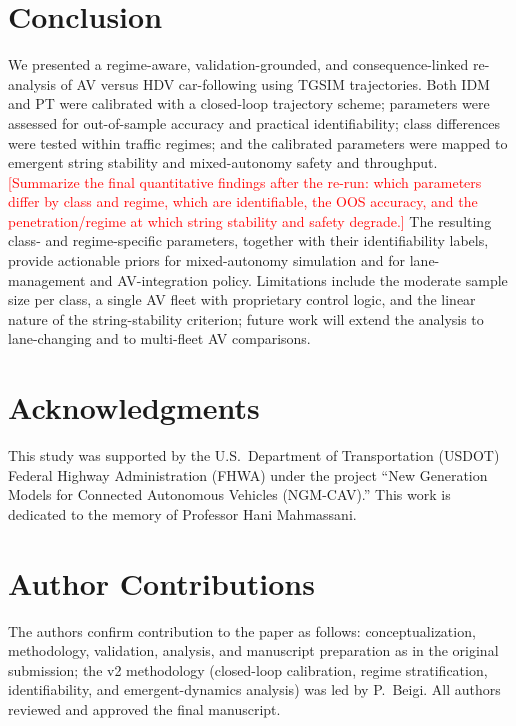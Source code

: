 \documentclass[11pt]{article}
\newcommand{\tbd}[1]{\textcolor{red}{[#1]}}        %
\begin{document}
\section{Conclusion}
We presented a regime-aware, validation-grounded, and consequence-linked
re-analysis of AV versus HDV car-following using TGSIM trajectories. Both IDM and
PT were calibrated with a closed-loop trajectory scheme; parameters were assessed
for out-of-sample accuracy and practical identifiability; class differences were
tested within traffic regimes; and the calibrated parameters were mapped to
emergent string stability and mixed-autonomy safety and throughput. \tbd{Summarize
the final quantitative findings after the re-run: which parameters differ by
class and regime, which are identifiable, the OOS accuracy, and the
penetration/regime at which string stability and safety degrade.} The resulting
class- and regime-specific parameters, together with their identifiability
labels, provide actionable priors for mixed-autonomy simulation and for
lane-management and AV-integration policy. Limitations include the moderate
sample size per class, a single AV fleet with proprietary control logic, and the
linear nature of the string-stability criterion; future work will extend the
analysis to lane-changing and to multi-fleet AV comparisons.

\section*{Acknowledgments}
This study was supported by the U.S.\ Department of Transportation (USDOT) Federal
Highway Administration (FHWA) under the project ``New Generation Models for
Connected Autonomous Vehicles (NGM-CAV).'' This work is dedicated to the memory of
Professor Hani Mahmassani.

\section*{Author Contributions}
The authors confirm contribution to the paper as follows: conceptualization,
methodology, validation, analysis, and manuscript preparation as in the original
submission; the v2 methodology (closed-loop calibration, regime stratification,
identifiability, and emergent-dynamics analysis) was led by P.\ Beigi. All authors
reviewed and approved the final manuscript.
\end{document}
